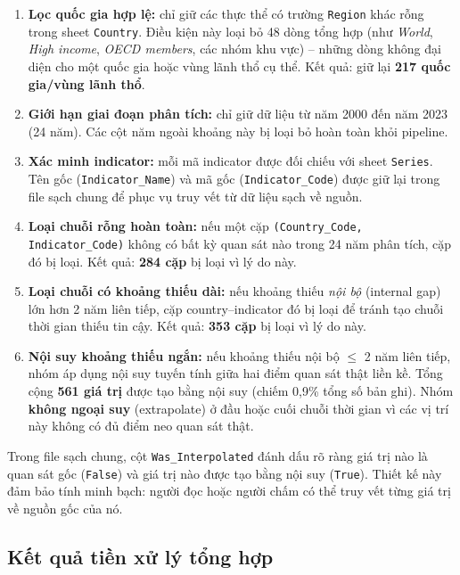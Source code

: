 \begin{enumerate}
    \item \textbf{Lọc quốc gia hợp lệ:} chỉ giữ các thực thể có trường \texttt{Region} khác rỗng trong sheet \texttt{Country}. Điều kiện này loại bỏ 48 dòng tổng hợp (như \textit{World}, \textit{High income}, \textit{OECD members}, các nhóm khu vực) -- những dòng không đại diện cho một quốc gia hoặc vùng lãnh thổ cụ thể. Kết quả: giữ lại \textbf{217 quốc gia/vùng lãnh thổ}.

    \item \textbf{Giới hạn giai đoạn phân tích:} chỉ giữ dữ liệu từ năm 2000 đến năm 2023 (24 năm). Các cột năm ngoài khoảng này bị loại bỏ hoàn toàn khỏi pipeline.

    \item \textbf{Xác minh indicator:} mỗi mã indicator được đối chiếu với sheet \texttt{Series}. Tên gốc (\texttt{Indicator\_Name}) và mã gốc (\texttt{Indicator\_Code}) được giữ lại trong file sạch chung để phục vụ truy vết từ dữ liệu sạch về nguồn.

    \item \textbf{Loại chuỗi rỗng hoàn toàn:} nếu một cặp \texttt{(Country\_Code, Indicator\_Code)} không có bất kỳ quan sát nào trong 24 năm phân tích, cặp đó bị loại. Kết quả: \textbf{284 cặp} bị loại vì lý do này.

    \item \textbf{Loại chuỗi có khoảng thiếu dài:} nếu khoảng thiếu \textit{nội bộ} (internal gap) lớn hơn 2 năm liên tiếp, cặp country--indicator đó bị loại để tránh tạo chuỗi thời gian thiếu tin cậy. Kết quả: \textbf{353 cặp} bị loại vì lý do này.

    \item \textbf{Nội suy khoảng thiếu ngắn:} nếu khoảng thiếu nội bộ $\leq$ 2 năm liên tiếp, nhóm áp dụng nội suy tuyến tính giữa hai điểm quan sát thật liền kề. Tổng cộng \textbf{561 giá trị} được tạo bằng nội suy (chiếm 0,9\% tổng số bản ghi). Nhóm \textbf{không ngoại suy} (extrapolate) ở đầu hoặc cuối chuỗi thời gian vì các vị trí này không có đủ điểm neo quan sát thật.
\end{enumerate}

Trong file sạch chung, cột \texttt{Was\_Interpolated} đánh dấu rõ ràng giá trị nào là quan sát gốc (\texttt{False}) và giá trị nào được tạo bằng nội suy (\texttt{True}). Thiết kế này đảm bảo tính minh bạch: người đọc hoặc người chấm có thể truy vết từng giá trị về nguồn gốc của nó.

\subsection{Kết quả tiền xử lý tổng hợp}

